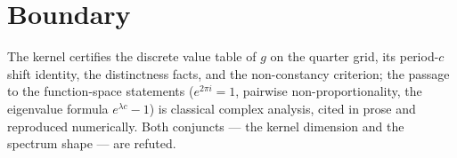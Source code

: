 \documentclass[11pt]{article}
\begin{document}
\section{Boundary}

The kernel certifies the discrete value table of $g$ on the quarter
grid, its period-$c$ shift identity, the distinctness facts, and the
non-constancy criterion; the passage to the function-space statements
($e^{2\pi i} = 1$, pairwise non-proportionality, the eigenvalue
formula $e^{\lambda c} - 1$) is classical complex analysis, cited in
prose and reproduced numerically.  Both conjuncts --- the kernel
dimension and the spectrum shape --- are refuted.
\end{document}
